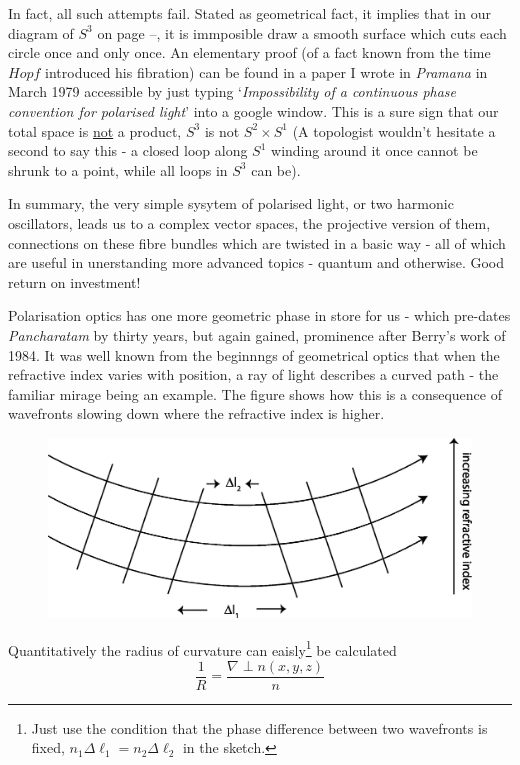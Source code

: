 In fact, all such attempts fail. Stated as geometrical fact, it implies that
in our diagram of $S^3$ on page --, it is immposible draw a smooth surface which
cuts each circle once and only once. An elementary proof (of a fact known
from the time $Hopf$ introduced his fibration) can be found in a paper I wrote in
\textit{Pramana} in March 1979 accessible by just typing `\textit{Impossibility of a continuous
phase convention for polarised light}' into a google window. This is a sure sign
that our total space is \underline{not} a product, $S^3$ is not $S^2 \times S^1$ (A topologist wouldn't
hesitate a second to say this - a closed loop along $S^1$ winding around it once
cannot be shrunk to a point, while all loops in $S^3$ can be).

In summary, the very simple sysytem of polarised light, or two harmonic
oscillators, leads us to a complex vector spaces, the projective version of them,
connections on these fibre bundles which are twisted in a basic way - all of which
are useful in unerstanding more advanced topics - quantum and otherwise. Good
return on investment!

Polarisation optics has one more geometric phase in store for us - which pre-dates \textit{Pancharatam} by thirty years, but again gained, prominence after Berry's work of 1984. It was well known from the beginnngs of geometrical optics that
when the refractive index varies with position, a ray of light describes a curved
path - the familiar mirage being an example. The figure shows how this is a consequence of
wavefronts slowing down where the refractive index is higher.
\bigskip

\begin{figure}[H]
\centering
\includegraphics[scale=0.19]{src/images/chap26/19.jpg}
\end{figure}
\bigskip

Quantitatively the radius of curvature can eaisly\footnote{Just use the condition that the phase difference between two wavefronts is fixed, $n_1 \Delta \ell_1 = n_2 \Delta \ell_2$ in the sketch.} be calculated
$$
\frac{1}{R} = \frac{\nabla \perp n (x,y,z)}{n}
$$

